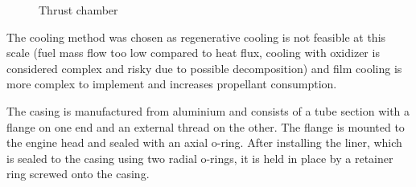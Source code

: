 \begin{figure}[H]
\centering
{}
\caption{Thrust chamber}
\label{fig:sysarch_prop_thrustChamber}
\end{figure}

The cooling method was chosen as regenerative cooling is not feasible at this scale (fuel mass flow too low compared to heat flux, cooling with oxidizer is considered complex and risky due to possible decomposition) and film cooling is more complex to implement and increases propellant consumption.

The casing is manufactured from aluminium and consists of a tube section with a flange on one end and an external thread on the other. The flange is mounted to the engine head and sealed with an axial o-ring. After installing the liner, which is sealed to the casing using two radial o-rings, it is held in place by a retainer ring screwed onto the casing.

